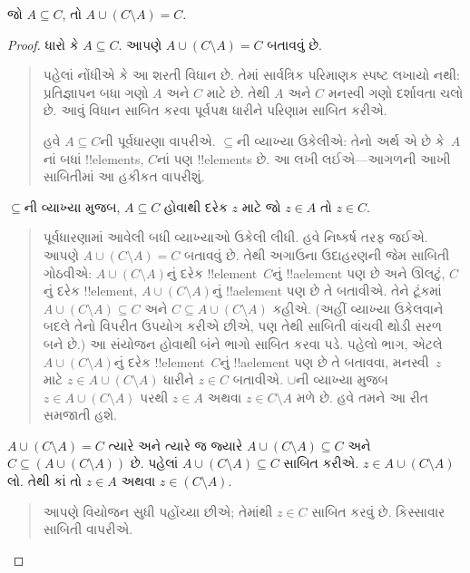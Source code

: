 \documentclass[../../../include/open-logic-section]{subfiles}
\begin{document}


\begin{prop}
જો $A \subseteq C$, તો $A \cup (C \setminus A) = C$.
\end{prop}

\begin{proof}
  ધારો કે $A \subseteq C$. આપણે $A \cup (C
  \setminus A) = C$ બતાવવું છે.
  \begin{quote}
    પહેલાં નોંધીએ કે આ શરતી વિધાન છે. તેમાં સાર્વત્રિક પરિમાણક
    સ્પષ્ટ લખાયો નથી: પ્રતિજ્ઞાપન બધા ગણો $A$ અને $C$ માટે
    છે. તેથી $A$ અને $C$ મનસ્વી ગણો દર્શાવતા ચલો છે. આવું
    વિધાન સાબિત કરવા પૂર્વપક્ષ ધારીને પરિણામ સાબિત કરીએ.

    હવે $A \subseteq C$ની પૂર્વધારણા વાપરીએ. $\subseteq$ની
    વ્યાખ્યા ઉકેલીએ: તેનો અર્થ એ છે કે~$A$નાં બધાં
    !!{element}s, $C$નાં પણ !!{element}s છે. આ લખી
    લઈએ---આગળની આખી સાબિતીમાં આ હકીકત વાપરીશું.
  \end{quote}
  $\subseteq$ની વ્યાખ્યા મુજબ, $A \subseteq C$ હોવાથી દરેક
  $z$ માટે જો $z \in A$ તો $z \in C$.
  \begin{quote}
    પૂર્વધારણામાં આવેલી બધી વ્યાખ્યાઓ ઉકેલી લીધી. હવે
    નિષ્કર્ષ તરફ જઈએ. આપણે $A \cup (C \setminus A) = C$
    બતાવવું છે. તેથી અગાઉના ઉદાહરણની જેમ સાબિતી ગોઠવીએ:
    $A \cup (C \setminus A)$નું દરેક !!{element}~$C$નું
    !!a{element} પણ છે અને ઊલટું, $C$નું દરેક !!{element},
    $A \cup (C
    \setminus A)$નું !!a{element} પણ છે તે બતાવીએ. તેને
    ટૂંકમાં $A \cup (C \setminus A)
    \subseteq C$ અને $C \subseteq A \cup (C \setminus A)$
    કહીએ. (અહીં વ્યાખ્યા ઉકેલવાને બદલે તેનો વિપરીત ઉપયોગ
    કરીએ છીએ, પણ તેથી સાબિતી વાંચવી થોડી સરળ બને છે.)
    આ સંયોજન હોવાથી બંને ભાગો સાબિત કરવા પડે. પહેલો ભાગ,
    એટલે $A \cup (C \setminus A)$નું દરેક !!{element}~$C$નું
    !!a{element} પણ છે તે બતાવવા, મનસ્વી~$z$ માટે
    $z \in A \cup (C \setminus A)$ ધારીને $z \in C$
    બતાવીએ. $\cup$ની વ્યાખ્યા મુજબ $z \in A \cup (C \setminus A)$
    પરથી $z \in A$ અથવા $z \in C \setminus A$ મળે છે.
    હવે તમને આ રીત સમજાતી હશે.
    \end{quote}
  $A \cup (C \setminus A) = C$ ત્યારે અને ત્યારે જ જ્યારે
  $A \cup (C \setminus A) \subseteq
  C$ અને $C \subseteq (A \cup (C \setminus A))$ છે. પહેલાં $A \cup (C \setminus A) \subseteq C$
  સાબિત કરીએ. $z \in A \cup (C
  \setminus A)$ લો. તેથી કાં તો $z \in A$ અથવા $z \in (C \setminus A)$.
  \begin{quote}
    આપણે વિયોજન સુધી પહોંચ્યા છીએ; તેમાંથી $z \in C$
    સાબિત કરવું છે. કિસ્સાવાર સાબિતી વાપરીએ.

\end{quote}
\end{proof}
\end{document}
